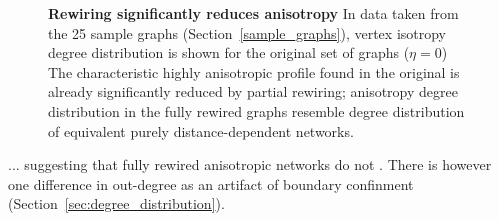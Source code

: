 \begin{figure}[H]
  \centering
  \caption{\textbf{Rewiring significantly reduces anisotropy} In data
    taken from the 25 sample graphs (Section~\ref{sample_graphs}),
    vertex isotropy degree distribution is shown for the original set
    of graphs ($\eta = 0$) The characteristic highly anisotropic
    profile found in the original is already significantly reduced by
    partial rewiring; anisotropy degree distribution in the fully
    rewired graphs resemble degree distribution of equivalent purely
    distance-dependent networks.}%
  \label{fig:anisotropy} %
\end{figure}


... suggesting that fully rewired anisotropic networks do not . There
is however one difference in out-degree as an artifact of boundary
confinment (Section~\ref{sec:degree_distribution}).



